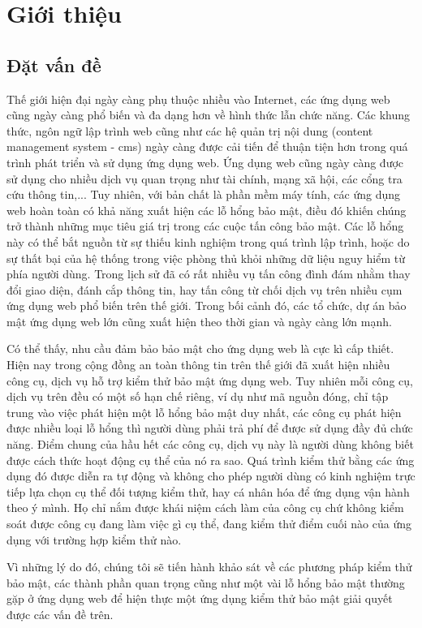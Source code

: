 \cleardoublepage
{}
\chapter{Giới thiệu}
\section{Đặt vấn đề}
Thế giới hiện đại ngày càng phụ thuộc nhiều vào Internet, các ứng dụng web cũng ngày càng phổ biến và đa dạng hơn về hình thức lẫn chức năng. Các khung thức, ngôn ngữ lập trình web cũng như các hệ quản trị nội dung (content management system - \acrshort{cms}) ngày càng được cải tiến để thuận tiện hơn trong quá trình phát triển và sử dụng ứng dụng web. Ứng dụng web cũng ngày càng được sử dụng cho nhiều dịch vụ quan trọng như tài chính, mạng xã hội, các cổng tra cứu thông tin,... Tuy nhiên, với bản chất là phần mềm máy tính, các ứng dụng web hoàn toàn có khả năng xuất hiện các lỗ hổng bảo mật, điều đó khiến chúng trở thành những mục tiêu giá trị trong các cuộc tấn công bảo mật. Các lỗ hổng này có thể bắt nguồn từ sự thiếu kinh nghiệm trong quá trình lập trình, hoặc do sự thất bại của hệ thống trong việc phòng thủ khỏi những dữ liệu nguy hiểm từ phía người dùng. Trong lịch sử đã có rất nhiều vụ tấn công đình đám nhằm thay đổi giao diện, đánh cắp thông tin, hay tấn công từ chối dịch vụ trên nhiều cụm ứng dụng web phổ biến trên thế giới. Trong bối cảnh đó, các tổ chức, dự án bảo mật ứng dụng web lớn cũng xuất hiện theo thời gian và ngày càng lớn mạnh.\par
Có thể thấy, nhu cầu đảm bảo bảo mật cho ứng dụng web là cực kì cấp thiết. Hiện nay trong cộng đồng an toàn thông tin trên thế giới đã xuất hiện nhiều công cụ, dịch vụ hỗ trợ kiểm thử bảo mật ứng dụng web. Tuy nhiên mỗi công cụ, dịch vụ trên đều có một số hạn chế riêng, ví dụ như mã nguồn đóng, chỉ tập trung vào việc phát hiện một lỗ hổng bảo mật duy nhất, các công cụ phát hiện được nhiều loại lỗ hổng thì người dùng phải trả phí để được sử dụng đầy đủ chức năng. Điểm chung của hầu hết các công cụ, dịch vụ này là người dùng không biết được cách thức hoạt động cụ thể của nó ra sao. Quá trình kiểm thử bằng các ứng dụng đó được diễn ra tự động và không cho phép người dùng có kinh nghiệm trực tiếp lựa chọn cụ thể đối tượng kiểm thử, hay cá nhân hóa để ứng dụng vận hành theo ý mình. Họ chỉ nắm được khái niệm cách làm của công cụ chứ không kiểm soát được công cụ đang làm việc gì cụ thể, đang kiểm thử điểm cuối nào của ứng dụng với trường hợp kiểm thử nào.\par
Vì những lý do đó, chúng tôi sẽ tiến hành khảo sát về các phương pháp kiểm thử bảo mật, các thành phần quan trọng cũng như một vài lỗ hổng bảo mật thường gặp ở ứng dụng web để hiện thực một ứng dụng kiểm thử bảo mật giải quyết được các vấn đề trên.

